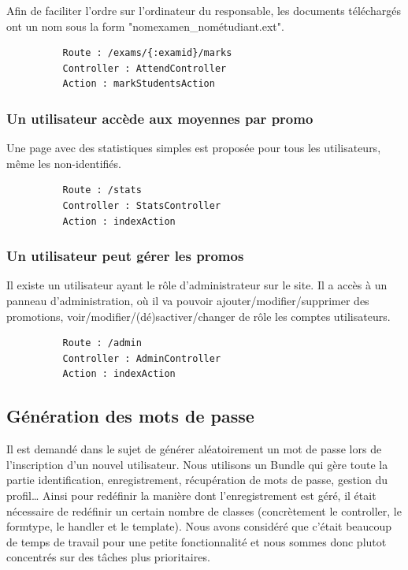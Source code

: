 \documentclass{report}
\begin{document}
        Afin de faciliter l'ordre sur l'ordinateur du responsable, les documents
        téléchargés ont un nom sous la form "nomexamen\_nométudiant.ext".

        \begin{verbatim}
          Route : /exams/{:examid}/marks
          Controller : AttendController
          Action : markStudentsAction
        \end{verbatim}

      \subsubsection{Un utilisateur accède aux moyennes par promo}
        Une page avec des statistiques simples est proposée pour tous les utilisateurs,
        même les non-identifiés.
        \begin{verbatim}
          Route : /stats
          Controller : StatsController
          Action : indexAction
        \end{verbatim}

      \subsubsection{Un utilisateur peut gérer les promos}
        Il existe un utilisateur ayant le rôle d'administrateur sur le site. Il
        a accès à un panneau d'administration, où il va pouvoir 
        ajouter/modifier/supprimer des promotions, voir/modifier/(dé)sactiver/changer de rôle
        les comptes utilisateurs.
        \begin{verbatim}
          Route : /admin
          Controller : AdminController
          Action : indexAction
        \end{verbatim}
 
    \subsection{Génération des mots de passe}
        Il est demandé dans le sujet de générer aléatoirement un mot de passe lors 
        de l'inscription d'un nouvel utilisateur. Nous utilisons un Bundle qui 
        gère toute la partie identification, enregistrement, récupération de mots
        de passe, gestion du profil… Ainsi pour redéfinir la manière dont l'enregistrement
        est géré, il était nécessaire de redéfinir un certain nombre de classes
        (concrètement le controller, le formtype, le handler et le template). Nous
        avons considéré que c'était beaucoup de temps de travail pour une petite fonctionnalité
        et nous sommes donc plutot concentrés sur des tâches plus prioritaires.
        
\end{document}
